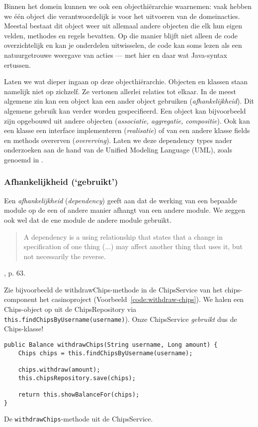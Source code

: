 Binnen het domein kunnen we ook een objecthiërarchie waarnemen:
vaak hebben we één object die verantwoordelijk is voor het uitvoeren van 
de domeinacties. Meestal bestaat dit object weer uit allemaal andere objecten
die elk hun eigen velden, methodes en regels bevatten. Op die manier blijft 
niet alleen de code overzichtelijk en kan je onderdelen uitwisselen, de code 
kan soms lezen als een natuurgetrouwe weergave van acties --- met hier en daar 
wat Java-syntax ertussen.

Laten we wat dieper ingaan op deze objecthiërarchie. 
Objecten en klassen staan namelijk niet op zichzelf.
Ze vertonen allerlei relaties tot elkaar. In de meest algemene 
zin kan een object kan een ander object gebruiken (\textit{afhankelijkheid}).
Dit algemene gebruik kan verder worden gespecifieerd. Een object kan 
bijvoorbeeld zijn opgebouwd uit andere objecten (\textit{associatie, aggregatie, compositie}).
Ook kan een klasse een interface implementeren (\textit{realisatie}) of
van een andere klasse fields en methods overerven (\textit{overerving}).
Laten we deze dependency types nader onderzoeken aan de hand 
van de Unified Modeling Language (UML), zoals genoemd in \cite{Booch1999}.

\subsubsection{Afhankelijkheid (`gebruikt')}
Een \textit{afhankelijkheid} (\textit{dependency}) geeft aan dat 
de werking van een bepaalde module op de een of andere manier afhangt
van een andere module. We zeggen ook wel dat de ene module de andere 
module gebruikt.

\blockquote{
    A dependency is a using relationship that states
    that a change in specification of one thing (...)
    may affect another thing that uses it, 
    but not necessarily the reverse.    
}{\cite{Booch1999}, p. 63.}

Zie bijvoorbeeld de withdrawChips-methode in de ChipsService 
van het chips-component het casinoproject (Voorbeeld~\ref{code:withdraw-chips}). 
We halen een Chips-object op uit de ChipsRepository 
via \texttt{this.findChipsByUsername(username)}).
Onze ChipsService \textit{gebruikt} dus de Chips-klasse!

\begin{listing}[H]
\begin{verbatim}
public Balance withdrawChips(String username, Long amount) {
    Chips chips = this.findChipsByUsername(username);

    chips.withdraw(amount);
    this.chipsRepository.save(chips);

    return this.showBalanceFor(chips);
}
\end{verbatim}
\caption{De \texttt{withdrawChips}-methode uit de ChipsService.}
\label{code:withdraw-chips}
\end{listing}

